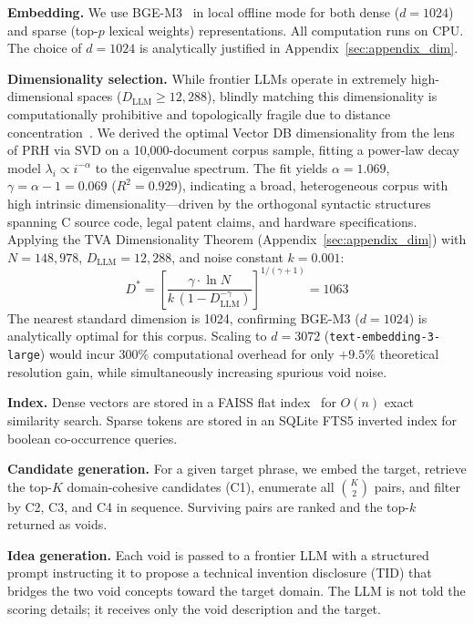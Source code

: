 \documentclass[11pt,twocolumn]{article}
\begin{document}
\textbf{Embedding.}  We use BGE-M3~\cite{chen2024bge} in local
offline mode for both dense ($d=1024$) and sparse (top-$p$ lexical
weights) representations.  All computation runs on CPU.
The choice of $d=1024$ is analytically justified in
Appendix~\ref{sec:appendix_dim}.

\textbf{Dimensionality selection.}
While frontier LLMs operate in extremely high-dimensional spaces
($D_{\mathrm{LLM}} \ge 12{,}288$), blindly matching this dimensionality
is computationally prohibitive and topologically fragile due to
distance concentration~\cite{beyer1999nearest}.
We derived the optimal Vector DB dimensionality from the lens of
PRH via SVD on a 10,000-document corpus sample, fitting a power-law
decay model $\lambda_i \propto i^{-\alpha}$ to the eigenvalue spectrum.
The fit yields $\alpha = 1.069$, $\gamma = \alpha - 1 = 0.069$
($R^2 = 0.929$), indicating a broad, heterogeneous corpus with
high intrinsic dimensionality---driven by the orthogonal syntactic
structures spanning C source code, legal patent claims, and
hardware specifications.
Applying the TVA Dimensionality Theorem
(Appendix~\ref{sec:appendix_dim}) with $N = 148{,}978$,
$D_{\mathrm{LLM}} = 12{,}288$, and noise constant $k = 0.001$:
\[
  D^* = \left[\frac{\gamma \cdot \ln N}{k\,(1 - D_{\mathrm{LLM}}^{-\gamma})}\right]^{1/(\gamma+1)} = 1063
\]
The nearest standard dimension is 1024, confirming BGE-M3 ($d=1024$)
is analytically optimal for this corpus.
Scaling to $d=3072$ (\texttt{text-embedding-3-large}) would incur
$300\%$ computational overhead for only $+9.5\%$ theoretical resolution
gain, while simultaneously increasing spurious void noise.

\textbf{Index.}  Dense vectors are stored in a FAISS flat
index~\cite{johnson2021faiss} for $O(n)$ exact similarity search.
Sparse tokens are stored in an SQLite FTS5 inverted index for
boolean co-occurrence queries.

\textbf{Candidate generation.}  For a given target phrase, we embed
the target, retrieve the top-$K$ domain-cohesive candidates (C1),
enumerate all $\binom{K}{2}$ pairs, and filter by C2, C3, and C4 in
sequence.  Surviving pairs are ranked and the top-$k$ returned as voids.

\textbf{Idea generation.}  Each void is passed to a frontier LLM with
a structured prompt instructing it to propose a technical invention
disclosure (TID) that bridges the two void concepts toward the target
domain.  The LLM is not told the scoring details; it receives only the
void description and the target.
\end{document}

